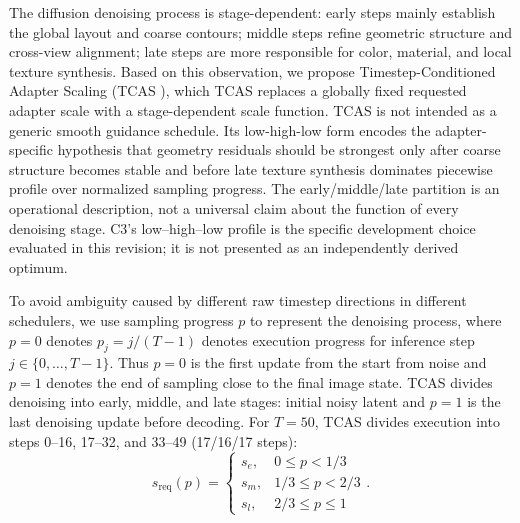 \documentclass[times,twocolumn,final]{elsarticle}
\providecommand{\DIFadd}[1]{{\protect\color{blue} \sf #1}} %
\providecommand{\DIFdel}[1]{{\protect\color{red} \scriptsize #1}} %
\providecommand{\DIFaddbegin}{} %
\providecommand{\DIFaddend}{} %
\providecommand{\DIFdelbegin}{} %
\providecommand{\DIFdelend}{} %
\begin{document}
\DIFdelbegin \DIFdel{The diffusion denoising process is stage-dependent: early steps mainly establish the global layout and coarse contours; middle steps refine geometric structure and cross-view alignment; late steps are more responsible for color, material, and local texture synthesis. Based on this observation, we propose Timestep-Conditioned Adapter Scaling (TCAS ), which }\DIFdelend \DIFaddbegin \DIFadd{TCAS }\DIFaddend replaces a globally fixed \DIFaddbegin \DIFadd{requested }\DIFaddend adapter scale with a \DIFdelbegin \DIFdel{stage-dependent scale function. TCAS is not intended as a generic smooth guidance schedule. Its low-high-low form encodes the adapter-specific hypothesis that geometry residuals should be strongest only after coarse structure becomes stable and before late texture synthesis dominates}\DIFdelend \DIFaddbegin \DIFadd{piecewise profile over normalized sampling progress. The early/middle/late partition is an operational description, not a universal claim about the function of every denoising stage. C3's low--high--low profile is the specific development choice evaluated in this revision; it is not presented as an independently derived optimum}\DIFaddend .

To avoid ambiguity caused by different raw timestep directions in different schedulers, \DIFdelbegin \DIFdel{we use sampling progress $p$ to represent the denoising process, where $p = 0$ denotes }\DIFdelend \DIFaddbegin \DIFadd{$p_j=j/(T-1)$ denotes execution progress for inference step $j\in\{0,\ldots,T-1\}$. Thus $p=0$ is the first update from }\DIFaddend the \DIFdelbegin \DIFdel{start from noise and $p = 1$ denotes the end of sampling close to the final image state. TCAS divides denoising into early, middle, and late stages:
}%
\DIFdelend \DIFaddbegin \DIFadd{initial noisy latent and $p=1$ is the last denoising update before decoding. For $T=50$, TCAS divides execution into steps 0--16, 17--32, and 33--49 (17/16/17 steps):
}\begin{equation}
s_{\mathrm{req}}(p) = \begin{cases} s_e, & 0 \leq p < 1/3 \\ s_m, & 1/3 \leq p < 2/3 \\ s_l, & 2/3 \leq p \leq 1 \end{cases}.
\label{eq:tcas}
\end{equation}\DIFaddend 
\end{document}
